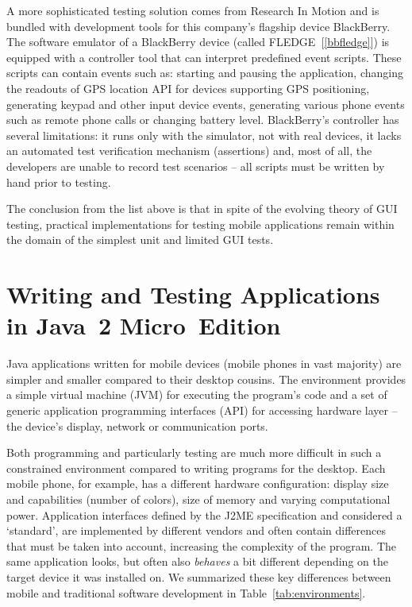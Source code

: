 \documentclass{llncs}
\newcommand{\customtextsc}[1]{{\scriptsize \MakeUppercase{#1}}}
\newcommand{\acro}[1]{\customtextsc{#1}}   %
\newcommand{\gui}{\acro{gui}}              %
\newcommand{\jme}{\acro{j2me}}             %
\newcommand{\pcite}[1]{[\ref{#1}]}         %
\begin{document}
A more sophisticated testing solution comes from Research In Motion and is bundled with development
tools for this company's flagship device BlackBerry. The software emulator of a BlackBerry device
(called \acro{Fledge}~\pcite{bbfledge}) is equipped with a controller tool that can interpret
predefined event scripts. These scripts can contain events such as: starting and pausing the
application, changing the readouts of \acro{GPS} location \acro{API} for devices supporting \acro{GPS} positioning,
generating keypad and other input device events, generating various phone events such as remote
phone calls or changing battery level. BlackBerry's controller has several limitations: it runs only
with the simulator, not with real devices, it lacks an automated test verification mechanism
(assertions) and, most of all, the developers are unable to record test scenarios -- all scripts
must be written by hand prior to testing.

The conclusion from the list above is that in spite of the evolving theory of \gui{} testing,
practical implementations for testing mobile applications remain within the domain of the simplest
unit and limited \gui{} tests.


\section{Writing and Testing Applications in Java~2 Micro~Edition} %

Java applications written for mobile devices (mobile phones in vast majority) are simpler and
smaller compared to their desktop cousins. The environment provides a simple virtual machine (\acro{jvm}) for
executing the program's code and a set of generic application programming interfaces (\acro{api})
for accessing hardware layer -- the device's display, network or communication ports.

Both programming and particularly testing are much more difficult in such a constrained environment
compared to writing programs for the desktop. Each mobile phone, for example, has a different
hardware configuration: display size and capabilities (number of colors), size of memory and varying
computational power. Application interfaces defined by the \jme{} specification and considered a
`standard', are implemented by different vendors and often contain differences that must be taken
into account, increasing the complexity of the program. The same application looks, but often also
\emph{behaves} a bit different depending on the target device it was installed on. We summarized
these key differences between mobile and traditional software development in 
Table~\ref{tab:environments}.
\end{document}
